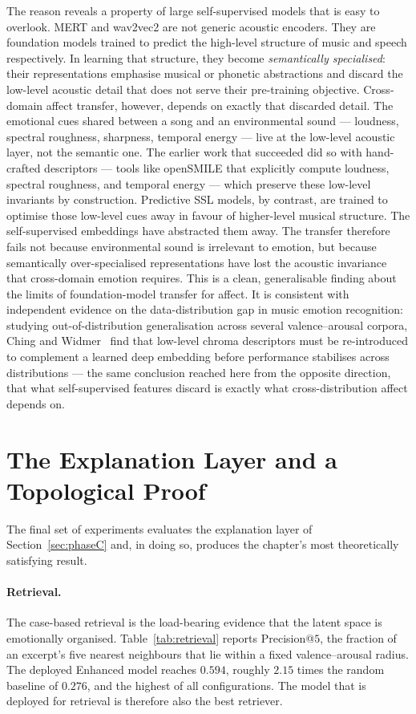 \documentclass[12pt]{report}
\begin{document}
The reason reveals a property of large self-supervised models that is easy to overlook. MERT and wav2vec2 are not generic acoustic encoders. They are foundation models trained to predict the high-level structure of music and speech respectively. In learning that structure, they become \emph{semantically specialised}: their representations emphasise musical or phonetic abstractions and discard the low-level acoustic detail that does not serve their pre-training objective. Cross-domain affect transfer, however, depends on exactly that discarded detail. The emotional cues shared between a song and an environmental sound --- loudness, spectral roughness, sharpness, temporal energy --- live at the low-level acoustic layer, not the semantic one. The earlier work that succeeded did so with hand-crafted descriptors --- tools like openSMILE that explicitly compute loudness, spectral roughness, and temporal energy --- which preserve these low-level invariants by construction. Predictive SSL models, by contrast, are trained to optimise those low-level cues away in favour of higher-level musical structure. The self-supervised embeddings have abstracted them away. The transfer therefore fails not because environmental sound is irrelevant to emotion, but because semantically over-specialised representations have lost the acoustic invariance that cross-domain emotion requires. This is a clean, generalisable finding about the limits of foundation-model transfer for affect. It is consistent with independent evidence on the data-distribution gap in music emotion recognition: studying out-of-distribution generalisation across several valence--arousal corpora, Ching and Widmer~\cite{ching_data_2025} find that low-level chroma descriptors must be re-introduced to complement a learned deep embedding before performance stabilises across distributions --- the same conclusion reached here from the opposite direction, that what self-supervised features discard is exactly what cross-distribution affect depends on.

\section{The Explanation Layer and a Topological Proof}
\label{sec:results-topology}

The final set of experiments evaluates the explanation layer of Section~\ref{sec:phaseC} and, in doing so, produces the chapter's most theoretically satisfying result.

\paragraph{Retrieval.} The case-based retrieval is the load-bearing evidence that the latent space is emotionally organised. Table~\ref{tab:retrieval} reports Precision@$5$, the fraction of an excerpt's five nearest neighbours that lie within a fixed valence--arousal radius. The deployed Enhanced model reaches $0.594$, roughly $2.15$ times the random baseline of $0.276$, and the highest of all configurations. The model that is deployed for retrieval is therefore also the best retriever.
\end{document}
